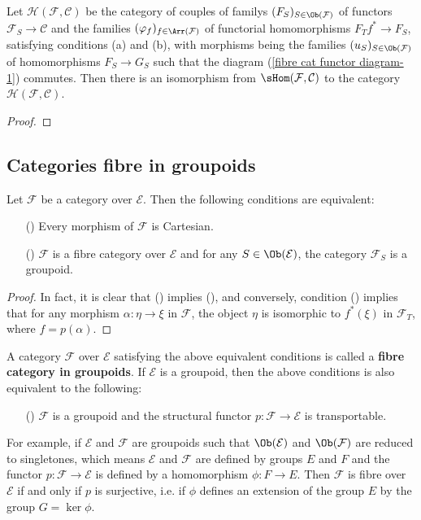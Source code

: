 \begin{proposition}\label{fibre cat functor to cat char by fiber}
Let $\mathcal{H}(\mathcal{F},\mathcal{C})$ be the category of couples of familys $(F_S)_{S\in\Ob(\mathcal{F})}$ of functors $\mathcal{F}_S\to \mathcal{C}$ and the families $(\varphi_f)_{f\in\Arr(\mathcal{F})}$ of functorial homomorphisms $F_Tf^*\to F_S$, satisfying conditions (a) and (b), with morphisms being the families $(u_S)_{S\in\Ob(\mathcal{F})}$ of homomorphisms $F_S\to G_S$ such that the diagram (\ref{fibre cat functor diagram-1}) commutes. Then there is an isomorphism from $\sHom(\mathcal{F},\mathcal{C})$ to the category $\mathcal{H}(\mathcal{F},\mathcal{C})$.
\end{proposition}
\begin{proof}

\end{proof}

\subsection{Categories fibre in groupoids}
\begin{proposition}\label{fibre cat in groupoid def}
Let $\mathcal{F}$ be a category over $\mathcal{E}$. Then the following conditions are equivalent:
\begin{enumerate}
\item[(\rmnum{1})] Every morphism of $\mathcal{F}$ is Cartesian.
\item[(\rmnum{2})] $\mathcal{F}$ is a fibre category over $\mathcal{E}$ and for any $S\in\Ob(\mathcal{E})$, the category $\mathcal{F}_S$ is a groupoid.
\end{enumerate}
\end{proposition}
\begin{proof}
In fact, it is clear that () implies (), and conversely, condition () implies that for any morphism $\alpha:\eta\to \xi$ in $\mathcal{F}$, the object $\eta$ is isomorphic to $f^*(\xi)$ in $\mathcal{F}_T$, where $f=p(\alpha)$.
\end{proof}

A category $\mathcal{F}$ over $\mathcal{E}$ satisfying the above equivalent conditions is called a \textbf{fibre category in groupoids}. If $\mathcal{E}$ is a groupoid, then the above conditions is also equivalent to the following:
\begin{enumerate}
\item[(\rmnum{3})] $\mathcal{F}$ is a groupoid and the structural functor $p:\mathcal{F}\to \mathcal{E}$ is transportable. 
\end{enumerate}
For example, if $\mathcal{E}$ and $\mathcal{F}$ are groupoids such that $\Ob(\mathcal{E})$ and $\Ob(\mathcal{F})$ are reduced to singletones, which means $\mathcal{E}$ and $\mathcal{F}$ are defined by groups $E$ and $F$ and the functor $p:\mathcal{F}\to \mathcal{E}$ is defined by a homomorphism $\phi:F\to E$. Then $\mathcal{F}$ is fibre over $\mathcal{E}$ if and only if $p$ is surjective, i.e. if $\phi$ defines an extension of the group $E$ by the group $G=\ker\phi$. 

